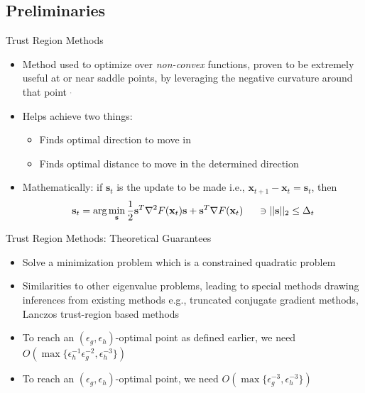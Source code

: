 \documentclass[10pt]{beamer}
\newcommand{\h}{\nabla^{2}}
\newcommand{\g}{\nabla}
\newcommand{\xbold}{\mathbf{x}}
\newcommand{\sbold}{\mathbf{s}}
\newcommand{\eg}{\epsilon_{g}}
\newcommand{\eh}{\epsilon_{h}}
\newcommand{\citecomma}{\({}^{{}_{,}}\)}
\begin{document}
\subsection{Preliminaries}
\begin{frame}{Trust Region Methods}
\begin{itemize}
\item<1->{Method used to optimize over \emph{non-convex} functions, proven to be extremely useful at or near saddle points, by leveraging the negative curvature around that point \citecomma{}}
\item<2->{Helps achieve two things:
  \begin{itemize}
    \item<3->Finds optimal direction to move in
    \item<4->Finds optimal distance to move in the determined direction
  \end{itemize}
  }
\item<5->{Mathematically: if \(\sbold_{t}\) is the update to be made i.e., \(\xbold_{t+1} - \xbold_{t} = \sbold_{t}\), then
\begin{equation}
\label{TR}
\sbold_{t} = \text{arg}\min_{\sbold} \frac{1}{2}\sbold^{T} \h F(\xbold_{t}) \sbold + \sbold^{T} \g F(\xbold_{t}) \hspace{5mm}\ni ||\sbold||_{2} \leq \Delta_{t}
\end{equation} %
}
\end{itemize}
\end{frame}

\begin{frame}{Trust Region Methods: Theoretical Guarantees}
\begin{itemize}
\item<1->{Solve a minimization problem which is a constrained quadratic problem}
\item<2->{Similarities to other eigenvalue problems, leading to special methods drawing inferences from existing methods e.g., truncated conjugate gradient methods, Lanczos trust-region based methods}
\item<3->{To reach an \((\eg, \eh)\)-optimal point as defined earlier, we need \(O\left(\max\{\eh^{-1}\eg^{-2}, \eh^{-3}\}\right)\) } 
\item<4->{To reach an \((\eg, \eh)\)-optimal point, we need \(O\left(\max\{\eg^{-3}, \eh^{-3}\}\right)\) }
\end{itemize}
\end{frame}
\end{document}
